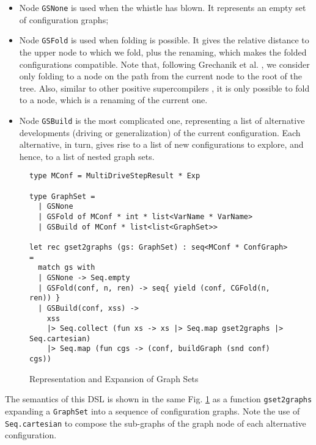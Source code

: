 \documentclass[submission,copyright,creativecommons]{eptcs}
\begin{document}
\begin{itemize}
  \item Node \verb|GSNone| is used when the whistle has blown. 
    It represents an empty set of configuration graphs;
  \item Node \verb|GSFold| is used when folding is possible. 
    It gives the relative distance to the upper node to which we fold, 
    plus the renaming, which makes the folded configurations compatible.
    Note that, following Grechanik et al. \cite{Romanenko2014StagedMRSC}, we consider
    only folding to a node on the path from the current node to the root of the tree.
    Also, similar to other positive supercompilers \cite{Sorensen1994TurchinSupercompiler,sorm98b,TMR/SCP2014},
    it is only possible to fold to a node, which is a renaming of the current one.
  \item Node \verb|GSBuild| is the most complicated one, representing a list
    of alternative developments (driving or generalization) of the current configuration.
    Each alternative, in turn, gives rise to a list of new configurations to explore,
    and hence, to a list of nested graph sets.
\end{itemize}

\begin{figure}
\begin{lstlisting}
type MConf = MultiDriveStepResult * Exp

type GraphSet =
  | GSNone
  | GSFold of MConf * int * list<VarName * VarName>
  | GSBuild of MConf * list<list<GraphSet>>

let rec gset2graphs (gs: GraphSet) : seq<MConf * ConfGraph> =
  match gs with
  | GSNone -> Seq.empty
  | GSFold(conf, n, ren) -> seq{ yield (conf, CGFold(n, ren)) }
  | GSBuild(conf, xss) ->
    xss
    |> Seq.collect (fun xs -> xs |> Seq.map gset2graphs |> Seq.cartesian)
    |> Seq.map (fun cgs -> (conf, buildGraph (snd conf) cgs))
\end{lstlisting}
\caption{Representation and Expansion of Graph Sets}
\label{fig:GraphSet}
\end{figure}

The semantics of this DSL is shown in the same Fig. \ref{fig:GraphSet} as
a function \verb|gset2graphs| expanding a \verb|GraphSet| into a sequence 
of configuration graphs.
Note the use of \verb|Seq.cartesian| to compose the sub-graphs of 
the graph node of each alternative configuration.
\end{document}
